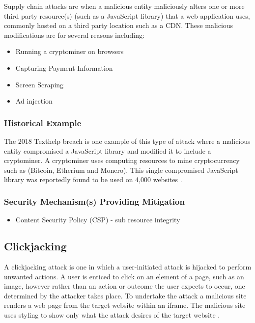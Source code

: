 \documentclass{mscreport}
\begin{document}
Supply chain attacks are when a malicious entity maliciously alters one or more third party resource(s) (such as a JavaScript library) that a web application uses, commonly hosted on a third party location such as a CDN. These malicious modifications are for several reasons including:

\begin{itemize}
	\setlength\itemsep{0.1em}
	\item Running a cryptominer \cite{Tekiner2021-sq} on browsers
	\item Capturing Payment Information
	\item Screen Scraping
	\item Ad injection
\end{itemize}

\subsubsection{Historical Example}
The 2018 Texthelp breach is one example of this type of attack where a malicious entity compromised a JavaScript library and modified it to include a cryptominer. A cryptominer uses computing resources to mine cryptocurrency such as (Bitcoin, Etherium and Monero). This single compromised JavaScript library was reportedly found to be used on 4,000 websites \cite{Billman2018-sq}.

\subsubsection{Security Mechanism(s) Providing Mitigation}

\begin{itemize}
	\setlength\itemsep{0.1em}
	\item Content Security Policy (CSP) - sub resource integrity
\end{itemize}

\subsection{Clickjacking}

A clickjacking attack is one in which a user-initiated attack is hijacked to perform unwanted actions. A user is enticed to click on an element of a page, such as an image, however rather than an action or outcome the user expects to occur, one determined by the attacker takes place. To undertake the attack a malicious site renders a web page from the target website within an iframe. The malicious site uses styling to show only what the attack desires of the target website \cite{Jamwal2018-tz}.
\end{document}
